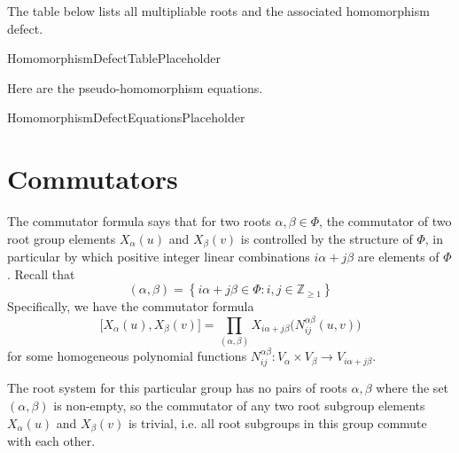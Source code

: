 \documentclass[11pt]{article}
\newcommand{\noi}{\noindent}
\newcommand{\tbf}{\textbf}
\newcommand{\lb}{\left\{}
\newcommand{\rb}{\right\}}
\newcommand{\Z}{\mathbb{Z}}
\theoremstyle{definition}
\newif\ifrootsystemreduced
\newif\ifsummablepairs
\begin{document}
\ifrootsystemreduced
Since the root system for this group is reduced, there are no multipliable roots and the product is always empty, hence each $X_\alpha$ is a group homomorphism there are no homomorphism defect coefficients.
\else
The table below lists all multipliable roots and the associated homomorphism defect.

\bigskip

HomomorphismDefectTablePlaceholder

\bigskip

\noi Here are the pseudo-homomorphism equations.

HomomorphismDefectEquationsPlaceholder

\fi

\newpage
\section{Commutators}

The commutator formula says that for two roots $\alpha, \beta \in \Phi$, the commutator of two root group elements $X_\alpha(u)$ and $X_\beta(v)$ is controlled by the structure of $\Phi$, in particular by which positive integer linear combinations $i\alpha + j\beta$ are elements of $\Phi$. Recall that
\[
	(\alpha, \beta) = \lb i \alpha + j\beta \in \Phi : i, j \in \Z_{\ge 1} \rb
\]
Specifically, we have the commutator formula
\[
	\Big[ X_\alpha(u), X_\beta(v) \Big] = \prod_{(\alpha, \beta)} X_{i\alpha + j\beta} \Big( N_{ij}^{\alpha \beta}(u,v) \Big)
\]
for some homogeneous polynomial functions $N_{ij}^{\alpha \beta}:V_{\alpha} \times V_{\beta} \to V_{i\alpha+j\beta}$. 
\ifsummablepairs
We repeat here the table of linear combinations of roots. The quantity $N_{ij}^{\alpha \beta}(u,v)$ is called a \tbf{commutator coefficient}. The table below gives these coefficients.

\bigskip

\def\arraystretch{1.2}
\noi 
\def\arraystretch{1}

\subsection{Commutator identities}

CommutatorEquationsPlaceholder

\else
The root system for this particular group has no pairs of roots $\alpha, \beta$ where the set $(\alpha, \beta)$ is non-empty, so the commutator of any two root subgroup elements $X_\alpha(u)$ and $X_\beta(v)$ is trivial, i.e. all root subgroups in this group commute with each other.
\fi
\end{document}
